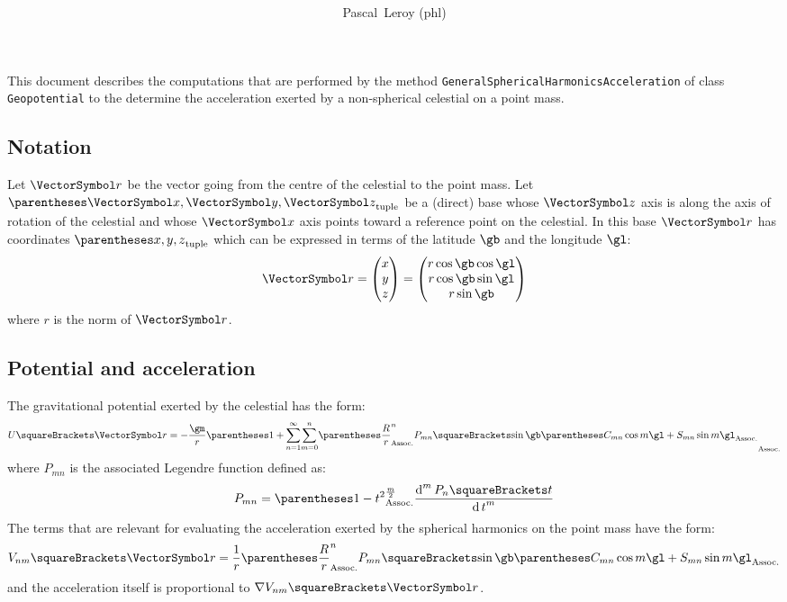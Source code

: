 \documentclass[10pt, a4paper, oneside]{basestyle}
\title{%
\textdisplay{%
Geopotential%
}%
}
\author{Pascal~Leroy (phl)}
\begin{document}
\maketitle
\begin{sloppypar}
\noindent
This document describes the computations that are performed by the method \texttt{GeneralSphericalHarmonicsAcceleration} of class \texttt{Geopotential} to the determine the acceleration exerted by a non-spherical celestial on a point mass.
\end{sloppypar}

\subsection*{Notation}
Let $\vr$ be the vector going from the centre of the celestial to the point mass.  Let $\tuple{\vx, \vy, \vz}$ be a (direct) base whose $\vz$ axis is along the axis of rotation of the celestial and whose $\vx$ axis points toward a reference point on the celestial.  In this base $\vr$ has coordinates $\tuple{x, y, z}$ which can be expressed in terms of the latitude $\gb$ and the longitude $\gl$:
\[
\vr=\begin{pmatrix}
x \\ y \\ z
\end{pmatrix}
=\begin{pmatrix}
r \cos \gb \cos \gl\\
r \cos \gb \sin \gl\\
r \sin \gb
\end{pmatrix}
\]
where $r$ is the norm of $\vr$.

\subsection*{Potential and acceleration}
The gravitational potential exerted by the celestial has the form:
\[
U\of\vr = -\frac{\gm}{r}\pa{1 + \sum{n = 1}[\infty] \sum{m = 0}[n] 
\pa{\frac{R}{r}}^n P_{m n}\of{\sin \gb}
\pa{C_{m n} \cos m \gl + S_{m n} \sin m \gl}
}
\]
where $P_{m n}$ is the associated Legendre function defined as:
\[
P_{m n} = \pa{1 - t^2}^{\frac{m}{2}} \deriv[m] t {P_n\of t}
\]
The terms that are relevant for evaluating the acceleration exerted by the spherical harmonics on the point mass have the form:
\[
V_{n m}\of\vr = \frac{1}{r}\pa{\frac{R}{r}}^n P_{m n}\of{\sin \gb}
\pa{C_{m n} \cos m \gl + S_{m n} \sin m \gl}
\]
and the acceleration itself is proportional to $\grad V_{n m}\of\vr$.
\end{document}
